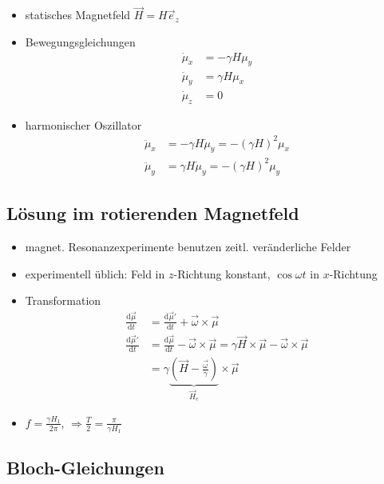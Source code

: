 \documentclass[
	a4paper,%
	twoside,%
	index=totoc,
	parskip=half,
 	chapterprefix,%
	headsepline,%
	13pt,%
	BCOR5mm,%
	fleqn,%
  openany,%
  ngerman
]{scrbook}
\begin{document}
\begin{itemize}
\item statisches Magnetfeld $\vec H = H \vec e_z$
\item Bewegungsgleichungen
  \begin{align}
  \dot \mu_x &= -\gamma H \mu_y \\
  \dot \mu_y &= \gamma H \mu_x \\
  \dot \mu_z &= 0
  \end{align}
\item harmonischer Oszillator
\begin{align}
\ddot \mu_x &= -\gamma H \dot \mu_y = -(\gamma H)^2 \mu_x \\
\ddot \mu_y &= \gamma H \dot \mu_y = -(\gamma H)^2 \mu_y
\end{align}
\end{itemize}


\subsection{Lösung im rotierenden Magnetfeld}

\begin{itemize}
\item magnet. Resonanzexperimente benutzen zeitl. veränderliche Felder
\item experimentell üblich: Feld in $z$-Richtung konstant, $\cos{\omega t}$ in $x$-Richtung
\item Transformation
\begin{align}
\frac{\mathrm{d}\vec \mu}{\mathrm{d}t} &= \frac{\mathrm{d}\vec \mu'}{\mathrm{d}t} + \vec \omega \times \vec \mu \\
\frac{\mathrm{d}\vec \mu'}{\mathrm{d}t} &= \frac{\mathrm{d}\vec \mu}{\mathrm{d}t} - \vec \omega \times \vec \mu = \gamma \vec H \times \vec \mu - \vec \omega \times \vec \mu\\
 &= \gamma \underbrace{\left( \vec H - \frac{\vec \omega}{\gamma}\right)}_{\vec H_e} \times \vec \mu
\end{align}
\item $f = \frac{\gamma H_1}{2\pi}$, $\Rightarrow \frac{T}{2} = \frac{\pi}{\gamma H_1}$
\end{itemize}


\subsection{Bloch-Gleichungen}
\end{document}
